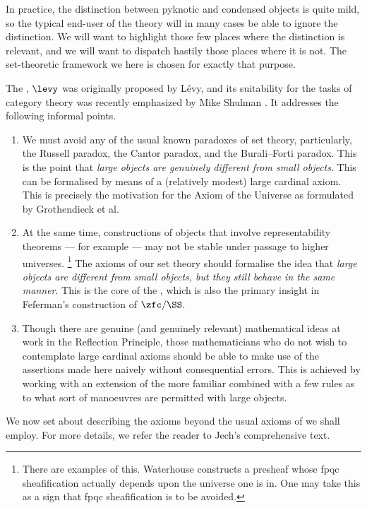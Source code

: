 In practice, the distinction between pyknotic and condensed objects is quite mild,
so the typical end-user of the theory will in many cases be able to ignore the distinction.
We will want to highlight those few places where the distinction is relevant,
and we will want to dispatch hastily those places where it is not.
The set-theoretic framework we  here is chosen for exactly that purpose.

The , $\levy$ was originally proposed by Lévy,\cite{Levy:1960wx}
and its suitability for the tasks of category theory was recently emphasized by Mike Shulman \cite{Shulman:2008th}.
It addresses the following informal points.
\begin{enumerate}
	\item We must avoid any of the usual known paradoxes of set theory,
		particularly, the Russell paradox, the Cantor paradox, and the Burali–Forti paradox.
		This is the point that \emph{large objects are genuinely different from small objects}.
		This can be formalised by means of a (relatively modest) large cardinal axiom.
		This is precisely the motivation for the Axiom of the Universe
		as formulated by Grothendieck et al.\cite[Exposé I, \S 0 and Appendix]{Anonymous:1972tk}
	\item At the same time, constructions of objects that involve representability theorems --- for example --- may not be stable under passage to higher universes.%
		\footnote{There are examples of this.
			Waterhouse constructs a presheaf whose fpqc sheafification actually depends upon the universe one is in.
			One may take this as a sign that fpqc sheafification is to be avoided.}
		The axioms of our set theory should formalise the idea that \emph{large objects are different from small objects, but they still behave in the same manner}.
		This is the core of the , which is also the primary insight in Feferman's construction of $\zfc/\SS$.
	\item Though there are genuine (and genuinely relevant) mathematical ideas at work in the Reflection Principle,
		those mathematicians who do not wish to contemplate large cardinal axioms should be able to make use of the assertions made here naively without consequential errors.
		This is achieved by working with an extension of the more familiar \zfc combined with a few rules as to what sort of manoeuvres are permitted with large objects.
\end{enumerate}

We now set about describing the axioms beyond the usual axioms of \zfc we shall employ.
For more details, we refer the reader to Jech's comprehensive text.\cite{Jech:2003tt}

